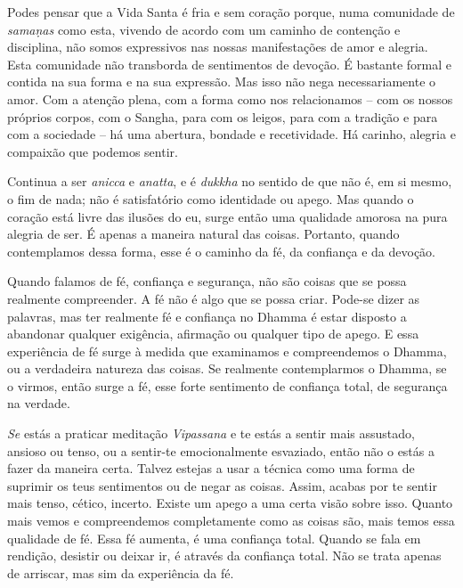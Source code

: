 Podes pensar que a Vida Santa é fria e sem coração porque, numa comunidade de
\emph{samaṇas} como esta, vivendo de acordo com um caminho de contenção e
disciplina, não somos expressivos nas nossas manifestações de amor e alegria.
Esta comunidade não transborda de sentimentos de devoção. É bastante formal e
contida na sua forma e na sua expressão. Mas isso não nega necessariamente o
amor. Com a atenção plena, com a forma como nos relacionamos -- com os nossos
próprios corpos, com o Sangha, para com os leigos, para com a tradição e para
com a sociedade -- há uma abertura, bondade e recetividade. Há carinho, alegria
e compaixão que podemos sentir.

Continua a ser \emph{anicca} e \emph{anatta}, e é \emph{dukkha} no sentido de
que não é, em si mesmo, o fim de nada; não é satisfatório como identidade ou
apego. Mas quando o coração está livre das ilusões do eu, surge então uma
qualidade amorosa na pura alegria de ser. É apenas a maneira natural das coisas.
Portanto, quando contemplamos dessa forma, esse é o caminho da fé, da confiança
e da devoção.

Quando falamos de fé, confiança e segurança, não são coisas que se possa
realmente compreender. A fé não é algo que se possa criar. Pode-se dizer as
palavras, mas ter realmente fé e confiança no Dhamma é estar disposto a
abandonar qualquer exigência, afirmação ou qualquer tipo de apego. E essa
experiência de fé surge à medida que examinamos e compreendemos o Dhamma, ou a
verdadeira natureza das coisas. Se realmente contemplarmos o Dhamma, se o
virmos, então surge a fé, esse forte sentimento de confiança total, de segurança
na verdade.

\emph{Se} estás a praticar meditação \emph{Vipassana} e te estás a sentir mais
assustado, ansioso ou tenso, ou a sentir-te emocionalmente esvaziado, então não
o estás a fazer da maneira certa. Talvez estejas a usar a técnica como uma forma
de suprimir os teus sentimentos ou de negar as coisas. Assim, acabas por te
sentir mais tenso, cético, incerto. Existe um apego a uma certa visão sobre
isso. Quanto mais vemos e compreendemos completamente como as coisas são, mais
temos essa qualidade de fé. Essa fé aumenta, é uma confiança total. Quando se
fala em rendição, desistir ou deixar ir, é através da confiança total. Não se
trata apenas de arriscar, mas sim da experiência da fé.


